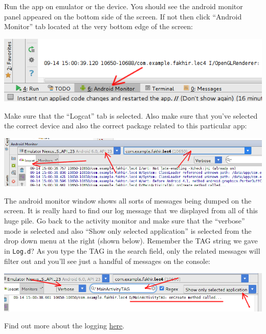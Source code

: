 Run the app on emulator or the device. You should see the android monitor panel appeared on the bottom side of the screen. If not then click ``Android Monitor'' tab located at the very bottom edge of the screen:

\begin{center}
	\includegraphics[scale=0.4]{chapters/ch04/images/36}
\end{center}

Make sure that the ``Logcat'' tab is selected. Also make sure that you've selected the correct device and also the correct package related to this particular app:

\begin{center}
	\includegraphics[scale=0.4]{chapters/ch04/images/37}
\end{center}

The android monitor window shows all sorts of messages being dumped on the screen. It is really hard to find our log message that we displayed from all of this huge pile. Go back to the activity monitor and make sure that the ``verbose'' mode is selected and also ``Show only selected application'' is selected from the drop down menu at the right (shown below). Remember the TAG string we gave in \texttt{Log.d}? As you type the TAG in the search field, only the related messages will filter out and you'll see just a handful of messages on the console:

\begin{center}
	\includegraphics[scale=0.4]{chapters/ch04/images/38}
\end{center}

Find out more about the logging \href{https://developer.android.com/reference/android/util/Log.html}{here}. \\

